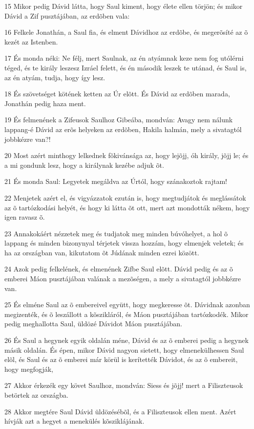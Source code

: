 \par 15 Mikor pedig Dávid látta, hogy Saul kiment, hogy élete ellen törjön; és mikor Dávid a Zif pusztájában, az erdõben vala:
\par 16 Felkele Jonathán, a Saul fia, és elment Dávidhoz az erdõbe, és megerõsíté az õ kezét az Istenben.
\par 17 És monda néki: Ne félj, mert Saulnak, az én atyámnak keze nem fog utólérni téged, és te király leszesz Izráel felett, és én második leszek te utánad, és Saul is, az én atyám, tudja, hogy így lesz.
\par 18 És szövetséget kötének ketten az Úr elõtt. És Dávid az erdõben marada, Jonathán pedig haza ment.
\par 19 És felmenének a Zifeusok Saulhoz Gibeába, mondván: Avagy nem nálunk lappang-é Dávid az erõs helyeken az erdõben, Hakila halmán, mely a sivatagtól jobbkézre van?!
\par 20 Most azért minthogy lelkednek fõkivánsága az, hogy lejõjj, óh király, jõjj le; és a mi gondunk lesz, hogy a királynak kezébe adjuk õt.
\par 21 És monda Saul: Legyetek megáldva az Úrtól, hogy szánakoztok rajtam!
\par 22 Menjetek azért el, és vigyázzatok ezután is, hogy megtudjátok és meglássátok az õ tartózkodási helyét, és hogy ki látta õt ott, mert azt mondották nékem, hogy igen ravasz õ.
\par 23 Annakokáért nézzetek meg és tudjatok meg minden búvóhelyet, a hol õ lappang és minden bizonynyal térjetek vissza hozzám, hogy elmenjek veletek; és ha az országban van, kikutatom õt Júdának minden ezrei között.
\par 24 Azok pedig felkelének, és elmenének Zifbe Saul elõtt. Dávid pedig és az õ emberei Máon pusztájában valának a mezõségen, a mely a sivatagtól jobbkézre van.
\par 25 És elméne Saul az õ embereivel együtt, hogy megkeresse õt. Dávidnak azonban megizenték, és õ leszállott a kõszikláról, és Máon pusztájában tartózkodék. Mikor pedig meghallotta Saul, üldözé Dávidot Máon pusztájában.
\par 26 És Saul a hegynek egyik oldalán méne, Dávid és az õ emberei pedig a hegynek másik oldalán. És épen, mikor Dávid nagyon sietett, hogy elmenekülhessen Saul elõl, és Saul és az õ emberei már körül is kerítették Dávidot, és az õ embereit, hogy megfogják,
\par 27 Akkor érkezék egy követ Saulhoz, mondván: Siess és jõjj! mert a Filiszteusok betörtek az országba.
\par 28 Akkor megtére Saul Dávid üldözésébõl, és a Filiszteusok ellen ment. Azért hívják azt a hegyet a menekülés kõsziklájának.

